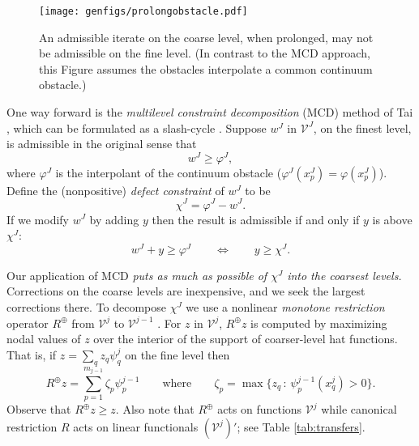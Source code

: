 \documentclass[letterpaper,final,12pt,reqno]{amsart}
\theoremstyle{claim}
\newcommand{\mR}{R^{\bm{\oplus}}}
\numberwithin{equation}{section}
\numberwithin{figure}{section}
\numberwithin{table}{section}
\numberwithin{theorem}{section}
\begin{document}
\begin{figure}
\qquad \texttt{[image: genfigs/prolongobstacle.pdf]}
\caption{An admissible iterate on the coarse level, when prolonged, may not be admissible on the fine level.  (In contrast to the MCD approach, this Figure assumes the obstacles interpolate a common continuum obstacle.)}
\label{fig:prolongobstacle}
\end{figure}

One way forward is the \emph{multilevel constraint decomposition} (MCD) method of Tai \cite{Tai2003}, which can be formulated as a slash-cycle \cite[Algorithm 4.7]{GraeserKornhuber2009}.  Suppose $w^J$ in $\mathcal{V}^J$, on the finest level, is admissible in the original sense that
\begin{equation}
  w^J \ge \varphi^J, \label{eq:fineadmissibleiterate}
\end{equation}
where $\varphi^J$ is the interpolant of the continuum obstacle ($\varphi^J(x_p^J)=\varphi(x_p^J)$).  Define the (nonpositive) \emph{defect constraint} \cite{GraeserKornhuber2009} of $w^J$ to be
\begin{equation}
  \chi^J = \varphi^J - w^J.  \label{eq:defectconstraint}
\end{equation}
If we modify $w^J$ by adding $y$ then the result is admissible if and only if $y$ is above $\chi^J$:
\begin{equation}
  w^J + y \ge \varphi^J  \qquad \iff \qquad y \ge \chi^J.  \label{eq:defectmeaning}
\end{equation}

Our application of MCD \emph{puts as much as possible of $\chi^J$ into the coarsest levels.}  Corrections on the coarse levels are inexpensive, and we seek the largest corrections there.  To decompose $\chi^J$ we use a nonlinear \emph{monotone restriction} operator $\mR$ from $\mathcal{V}^j$ to $\mathcal{V}^{j-1}$ \cite[equation (4.22)]{GraeserKornhuber2009}.  For $z$ in $\mathcal{V}^j$, $\mR z$ is computed by maximizing nodal values of $z$ over the interior of the support of coarser-level hat functions.  That is, if $z = \sum_q z_q \psi_q^j$ on the fine level then
\begin{equation}
  \mR z = \sum_{p=1}^{m_{j-1}} \zeta_p \psi_p^{j-1} \qquad \text{where} \qquad \zeta_p = \max \{z_q \,:\, \psi_p^{j-1}(x_q^j) > 0\}.  \label{eq:monotonerestriction}
\end{equation}
Observe that $\mR z \ge z$.  Also note that $\mR$ acts on functions $\mathcal{V}^j$ while canonical restriction $R$ acts on linear functionals $(\mathcal{V}^j)'$; see Table \ref{tab:transfers}.
\end{document}
